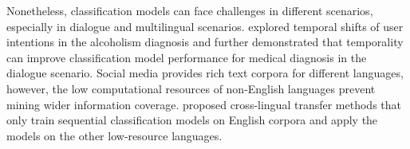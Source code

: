 Nonetheless, classification models can face challenges in different scenarios, especially in dialogue and multilingual scenarios. \cite{huang2018modeling} explored temporal shifts of user intentions in the alcoholism diagnosis and further demonstrated that temporality can improve classification model performance for medical diagnosis in the dialogue scenario.
Social media provides rich text corpora for different languages, however, the low computational resources of non-English languages prevent mining wider information coverage. 
\cite{huang2019matters} proposed cross-lingual transfer methods that only train sequential classification models on English corpora and apply the models on the other low-resource languages.
